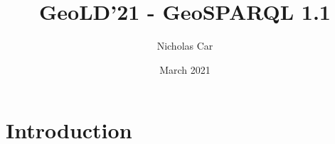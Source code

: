 \documentclass{article}
\title{GeoLD'21 - GeoSPARQL 1.1}
\author{Nicholas Car}
\date{March 2021}
\begin{document}
\maketitle

\section{Introduction}
\end{document}
